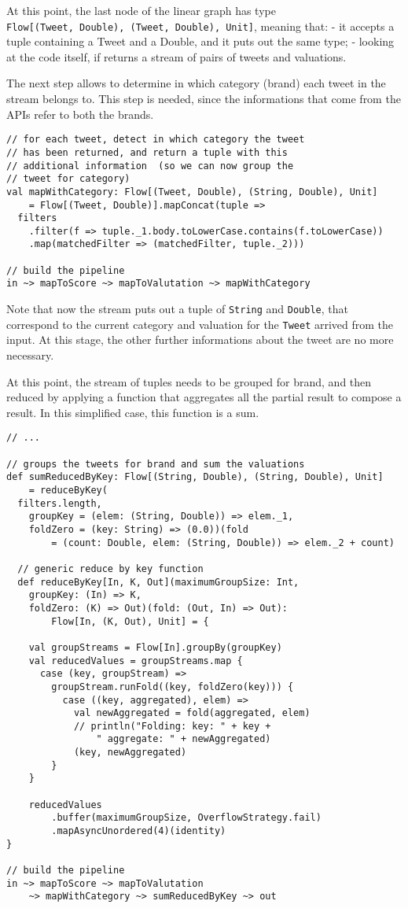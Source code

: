 At this point, the last node of the linear graph has type
\texttt{Flow{[}(Tweet,\ Double),\ (Tweet,\ Double),\ Unit{]}}, meaning
that: - it accepts a tuple containing a Tweet and a Double, and it puts
out the same type; - looking at the code itself, if returns a stream of
pairs of tweets and valuations.

The next step allows to determine in which category (brand) each tweet
in the stream belongs to. This step is needed, since the informations
that come from the APIs refer to both the brands.

\begin{verbatim}
// for each tweet, detect in which category the tweet
// has been returned, and return a tuple with this 
// additional information  (so we can now group the 
// tweet for category)
val mapWithCategory: Flow[(Tweet, Double), (String, Double), Unit]
    = Flow[(Tweet, Double)].mapConcat(tuple =>
  filters
    .filter(f => tuple._1.body.toLowerCase.contains(f.toLowerCase))
    .map(matchedFilter => (matchedFilter, tuple._2)))

// build the pipeline
in ~> mapToScore ~> mapToValutation ~> mapWithCategory
\end{verbatim}

Note that now the stream puts out a tuple of \texttt{String} and
\texttt{Double}, that correspond to the current category and valuation
for the \texttt{Tweet} arrived from the input. At this stage, the other
further informations about the tweet are no more necessary.

At this point, the stream of tuples needs to be grouped for brand, and then
reduced by applying a function that aggregates all the partial result to
compose a result. In this simplified case, this function is a sum.

\begin{verbatim}
// ...

// groups the tweets for brand and sum the valuations
def sumReducedByKey: Flow[(String, Double), (String, Double), Unit]
    = reduceByKey(
  filters.length,
    groupKey = (elem: (String, Double)) => elem._1,
    foldZero = (key: String) => (0.0))(fold
        = (count: Double, elem: (String, Double)) => elem._2 + count)

  // generic reduce by key function
  def reduceByKey[In, K, Out](maximumGroupSize: Int,
    groupKey: (In) => K,
    foldZero: (K) => Out)(fold: (Out, In) => Out):
        Flow[In, (K, Out), Unit] = {

    val groupStreams = Flow[In].groupBy(groupKey)
    val reducedValues = groupStreams.map {
      case (key, groupStream) =>
        groupStream.runFold((key, foldZero(key))) {
          case ((key, aggregated), elem) =>
            val newAggregated = fold(aggregated, elem)
            // println("Folding: key: " + key +
                " aggregate: " + newAggregated)
            (key, newAggregated)
        }
    }

    reducedValues
        .buffer(maximumGroupSize, OverflowStrategy.fail)
        .mapAsyncUnordered(4)(identity)
}

// build the pipeline
in ~> mapToScore ~> mapToValutation
    ~> mapWithCategory ~> sumReducedByKey ~> out
\end{verbatim}

